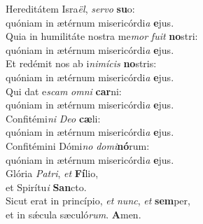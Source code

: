 \oddverse Hereditátem Isra\textit{ël}, \textit{ser}\textit{vo} \textbf{su}o:~\*\\
\oddverse quóniam in ætérnum misericórdi\textit{a} \textbf{e}jus.\\
\evenverse Quia in humilitáte nostra me\textit{mor} \textit{fu}\textit{it} \textbf{no}stri:~\*\\
\evenverse quóniam in ætérnum misericórdi\textit{a} \textbf{e}jus.\\
\oddverse Et redémit nos ab i\textit{ni}\textit{mí}\textit{cis} \textbf{no}stris:~\*\\
\oddverse quóniam in ætérnum misericórdi\textit{a} \textbf{e}jus.\\
\evenverse Qui dat e\textit{scam} \textit{om}\textit{ni} \textbf{car}ni:~\*\\
\evenverse quóniam in ætérnum misericórdi\textit{a} \textbf{e}jus.\\
\oddverse Confitémi\textit{ni} \textit{De}\textit{o} \textbf{cæ}li:~\*\\
\oddverse quóniam in ætérnum misericórdi\textit{a} \textbf{e}jus.\\
\evenverse Confitémini Dómi\textit{no} \textit{do}\textit{mi}\textbf{nó}rum:~\*\\
\evenverse quóniam in ætérnum misericórdi\textit{a} \textbf{e}jus.\\
\oddverse Glória \textit{Pa}\textit{tri}, \textit{et} \textbf{Fí}lio,~\*\\
\oddverse et Spirítu\textit{i} \textbf{San}cto.\\
\evenverse Sicut erat in princípio, \textit{et} \textit{nunc}, \textit{et} \textbf{sem}per,~\*\\
\evenverse et in sǽcula sæculó\textit{rum}. \textbf{A}men.\\
